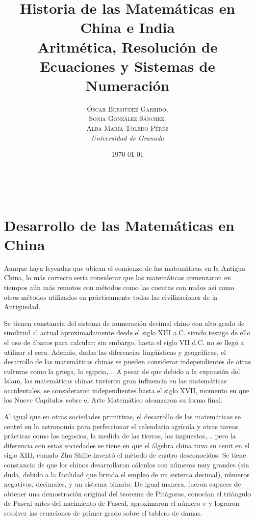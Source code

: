 \documentclass[a4paper, 11pt]{article}
\title{\textbf{Historia de las Matemáticas en China e India}\\ %
Aritmética, Resolución de Ecuaciones y Sistemas de Numeración} %
\author{ \textsc{Óscar Bermúdez Garrido, \\
		Sonia González Sánchez,\\ 
		Alba María Toledo Pérez} %
\\{\textit{Universidad de Granada}}} %
\date{\today} %
\makeatletter
\renewcommand{\maketitle}{
  \begin{flushright} %
  
  {\LARGE\@title} %
  
  \vspace{50pt} %
  
  {\large\@author} %
  \\\@date %
  \vspace{40pt} %
  \end{flushright}
}
\makeatother
\begin{document}
\maketitle %

\renewcommand{\abstractname}{Resumen} %



{\parskip=2pt
  \tableofcontents
}
\pagebreak


\newpage
\section{Desarrollo de las Matemáticas en China}
	Aunque haya leyendas que ubican el comienzo de las matemáticas en la Antigua China, lo más correcto sería considerar
	que las matemáticas comenzaron en tiempos aún más remotos con métodos como las cuentas con nudos así como otros métodos
	utilizados en prácticamente todas las civilizaciones de la Antigüedad.
	
	Se tienen constancia del sistema de numeración decimal chino con alto grado de similitud al actual aproximadamente
	desde el siglo XIII a.C. siendo testigo de ello el uso de ábacos para calcular; sin embargo, hasta el siglo VII d.C.
	no se llegó a utilizar el cero. Además, dadas las diferencias lingüísticas y geográficas, el desarrollo de las matemáticas
	chinas se pueden considerar independientes de otras culturas como la griega, la egipcia,... A pesar de que debido a la
	expansión del Islam, las matemáticas chinas tuvieron gran influencia en las matemáticas occidentales, se consideraron
	independientes hasta el siglo XVII, momento en que los Nueve Capítulos sobre el Arte Matemático alcanzaron su forma final.
	
	Al igual que en otras sociedades primitivas, el desarrollo de las matemáticas se centró en la astronomía para perfeccionar
	el calendario agrícola y otras tareas prácticas como los negocios, la medida de las tierras, los impuestos,... pero
	la diferencia con estas sociedades se tiene en que el álgebra china tuvo su cenit en el siglo XIII, cuando Zhu Shijie
	inventó el método de cuatro desconocidos. Se tiene constancia de que los chinos desarrollaron cálculos con números
	muy grandes (sin duda, debido a la facilidad que brinda el empleo de un sistema decimal), números negativos, decimales,
	y un sistema binario. De igual manera, fueron capaces de obtener una demostración original del teorema de Pitágoras,
	conocían el triángulo de Pascal antes del nacimiento de Pascal, aproximaron el número $\pi$ y lograron resolver las
	ecuaciones de primer grado sobre el tablero de damas.
	
\end{document}
